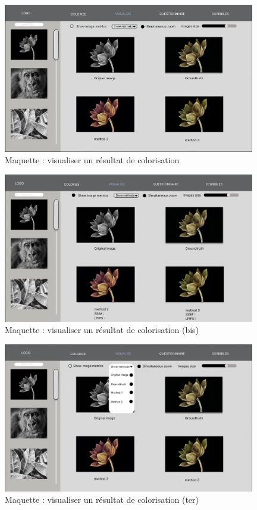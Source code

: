 \documentclass{article}
\begin{document}
\begin{figure}[htp]
    \centering
    \includegraphics[width=11cm]{visualiser-comparaison1.png}
    \caption{Maquette : visualiser un résultat de colorisation }
    \label{fig:maquette-visualiser-comparaison1}
\end{figure}

\begin{figure}[!ht]
    \centering
    \includegraphics[width=11cm]{visualiser-comparaison2.png}
    \caption{Maquette : visualiser un résultat de colorisation (bis)}
    \label{fig:maquette-visualiser-comparaison2}
\end{figure}

\begin{figure}[!ht]
    \centering
    \includegraphics[width=11cm]{visualiser-comparaison3.png}
    \caption{Maquette : visualiser un résultat de colorisation (ter)}
    \label{fig:maquette-visualiser-comparaison3}
\end{figure}
\end{document}

